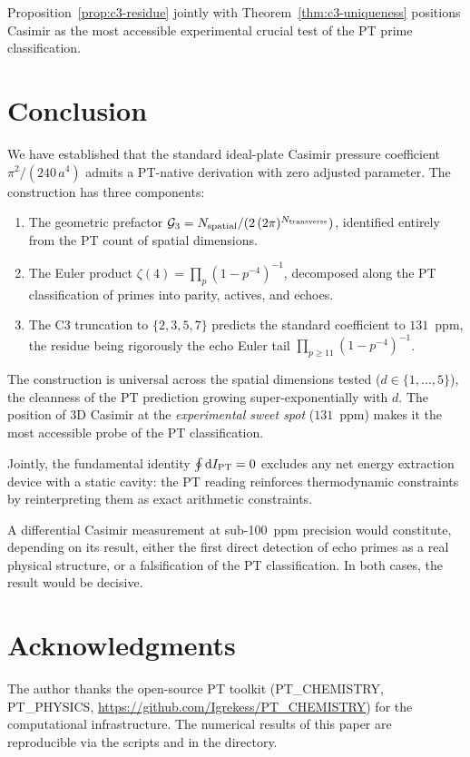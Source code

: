 \documentclass[11pt,a4paper]{article}
\newcommand{\PTset}{\{2,3,5,7\}}
\newcommand{\Nspatial}{N_{\rm spatial}}
\newcommand{\Ntrans}{N_{\rm transverse}}
\newcommand{\IPT}{I_{\rm PT}}
\begin{document}
Proposition~\ref{prop:c3-residue} jointly with Theorem~\ref{thm:c3-uniqueness} positions
Casimir as the most accessible experimental crucial test of the PT prime classification.

\section{Conclusion}

We have established that the standard ideal-plate Casimir pressure coefficient
$\pi^{2}/(240\,a^{4})$ admits a PT-native derivation with zero adjusted parameter. The
construction has three components:
\begin{enumerate}
  \item The geometric prefactor $\mathcal{G}_{3} = \Nspatial/(2\,(2\pi)^{\Ntrans})$, identified
  entirely from the PT count of spatial dimensions.
  \item The Euler product $\zeta(4) = \prod_{p}(1-p^{-4})^{-1}$, decomposed along the PT
  classification of primes into parity, actives, and echoes.
  \item The C3 truncation to $\PTset$ predicts the standard coefficient to $131$~ppm, the
  residue being rigorously the echo Euler tail $\prod_{p \geq 11}(1-p^{-4})^{-1}$.
\end{enumerate}

The construction is universal across the spatial dimensions tested ($d \in \{1,\ldots,5\}$),
the cleanness of the PT prediction growing super-exponentially with $d$. The position of 3D
Casimir at the \emph{experimental sweet spot} ($131$~ppm) makes it the most accessible probe
of the PT classification.

Jointly, the fundamental identity $\oint \mathrm{d}\IPT = 0$ excludes any net energy
extraction device with a static cavity: the PT reading reinforces thermodynamic constraints
by reinterpreting them as exact arithmetic constraints.

A differential Casimir measurement at sub-100~ppm precision would constitute, depending on
its result, either the first direct detection of echo primes as a real physical structure,
or a falsification of the PT classification. In both cases, the result would be decisive.

\section*{Acknowledgments}

The author thanks the open-source PT toolkit (PT\_CHEMISTRY, PT\_PHYSICS,
\url{https://github.com/Igrekess/PT_CHEMISTRY}) for the computational infrastructure. The
numerical results of this paper are reproducible via the scripts
 and  in the
 directory.
\end{document}
